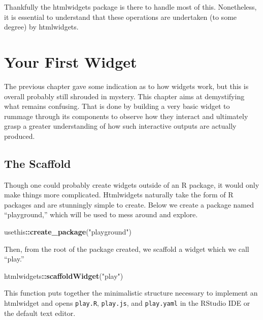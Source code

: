 \documentclass[10pt,]{krantz}
\makeatletter
\newenvironment{Shaded}{\begin{snugshade}}{\end{snugshade}}
\newcommand{\KeywordTok}[1]{\textcolor[rgb]{0.27,0.27,0.27}{\textbf{#1}}}
\newcommand{\NormalTok}[1]{#1}
\newcommand{\OperatorTok}[1]{\textcolor[rgb]{0.43,0.43,0.43}{\textbf{#1}}}
\newcommand{\StringTok}[1]{\textcolor[rgb]{0.5,0.5,0.5}{#1}}
\newenvironment{kframe}{%
\medskip{}
\setlength{\fboxsep}{.8em}
 \def\at@end@of@kframe{}%
 \ifinner\ifhmode%
  \def\at@end@of@kframe{\end{minipage}}%
  \begin{minipage}{\columnwidth}%
 \fi\fi%
 \def\FrameCommand##1{\hskip\@totalleftmargin \hskip-\fboxsep
 \colorbox{shadecolor}{##1}\hskip-\fboxsep
     \hskip-\linewidth \hskip-\@totalleftmargin \hskip\columnwidth}%
 \MakeFramed {\advance\hsize-\width
   \@totalleftmargin\z@ \linewidth\hsize
   \@setminipage}}%
 {\par\unskip\endMakeFramed%
 \at@end@of@kframe}
\renewenvironment{Shaded}{\begin{kframe}}{\end{kframe}}
\makeatother
\begin{document}
Thankfully the htmlwidgets package is there to handle most of this. Nonetheless, it is essential to understand that these operations are undertaken (to some degree) by htmlwidgets.

\hypertarget{widgets-first}{%
\chapter{Your First Widget}\label{widgets-first}}

The previous chapter gave some indication as to how widgets work, but this is overall probably still shrouded in mystery. This chapter aims at demystifying what remains confusing. That is done by building a very basic widget to rummage through its components to observe how they interact and ultimately grasp a greater understanding of how such interactive outputs are actually produced.

\hypertarget{widgets-first-scaffold}{%
\section{The Scaffold}\label{widgets-first-scaffold}}

Though one could probably create widgets outside of an R package, it would only make things more complicated. Htmlwidgets naturally take the form of R packages and are stunningly simple to create. Below we create a package named ``playground,'' which will be used to mess around and explore.

\begin{Shaded}
\begin{Highlighting}[]
\NormalTok{usethis}\OperatorTok{::}\KeywordTok{create_package}\NormalTok{(}\StringTok{"playground"}\NormalTok{)}
\end{Highlighting}
\end{Shaded}

Then, from the root of the package created, we scaffold a widget which we call ``play.''

\begin{Shaded}
\begin{Highlighting}[]
\NormalTok{htmlwidgets}\OperatorTok{::}\KeywordTok{scaffoldWidget}\NormalTok{(}\StringTok{"play"}\NormalTok{)}
\end{Highlighting}
\end{Shaded}

This function puts together the minimalistic structure necessary to implement an htmlwidget and opens \texttt{play.R}, \texttt{play.js}, and \texttt{play.yaml} in the RStudio IDE or the default text editor.
\end{document}
